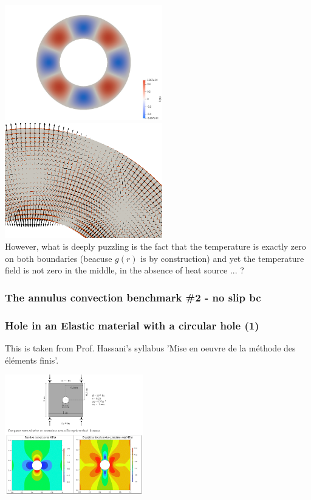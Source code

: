 \includegraphics[height=5cm]{images/benchmark_annulus_conv/T}
\includegraphics[height=5cm]{images/benchmark_annulus_conv/arrows}\\

However, what is deeply puzzling is the fact that the temperature is exactly zero on both 
boundaries (beacuse $g(r)$ is by construction) 
and yet the temperature field is not zero in the middle, in the absence of heat source ... ?

\newpage
\subsubsection{The annulus convection benchmark \#2 - no slip bc} \label{ss:anconv2}



\subsubsection{Hole in an Elastic material with a circular hole (1)\label{sec:elastic_hole}}

This is taken from Prof. Hassani's syllabus 'Mise en oeuvre de la m\'ethode des 
\'el\'ements finis'.

\begin{center}
\includegraphics[width=6cm]{images/benchmark_elastic_hole/hassani}
\end{center}

